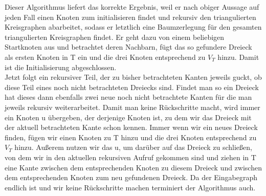 \documentclass[a4paper]{article}
\begin{document}
Dieser Algorithmus liefert das korrekte Ergebnis, weil er nach obiger Aussage auf jeden Fall einen Knoten zum initialisieren findet und rekursiv den triangulierten Kreisgraphen 
abarbeitet, sodass er letztlich eine Baumzerlegung für den gesamten triangulierten Kreisgraphen findet. Er geht dazu von einem beliebigen Startknoten aus und betrachtet deren Nachbarn, fügt das so gefundere Dreieck als ersten Knoten in T ein und die drei Knoten entsprechend zu $V_T$ hinzu. Damit ist die Initialisierung abgeschlossen. \\
Jetzt folgt ein rekursiver Teil, der zu bisher betrachteten Kanten jeweils guckt, ob diese Teil eines noch nicht betrachteten Dreiecks sind. Findet man so ein Dreieck hat dieses dann ebenfalls zwei neue noch nicht betrachtete Kanten für die man jeweils rekursiv weiterarbeitet. Damit man keine Rückschritte macht, wird immer ein Knoten u übergeben, der derjenige Knoten ist, zu dem wir das Dreieck mit der aktuell betrachteten Kante schon kennen. Immer wenn wir ein neues Dreieck finden, fügen wir einen Knoten zu T hinzu und die drei Knoten entsprechend zu $V_T$ hinzu. Außerem nutzen wir das u, um darüber auf das Dreieck zu schließen, von dem wir in den aktuellen rekursiven Aufruf gekommen sind und ziehen in T eine Kante zwischen dem entsprechenden Knoten zu diesem Dreieck und zwischen dem entsprechenden Knoten zum neu gefundenen Dreieck.
Da der Eingabegraph endlich ist und wir keine Rückschritte machen terminiert der Algorithmus auch.

	\section{}
	\subsubsection{}
	
\end{document}
